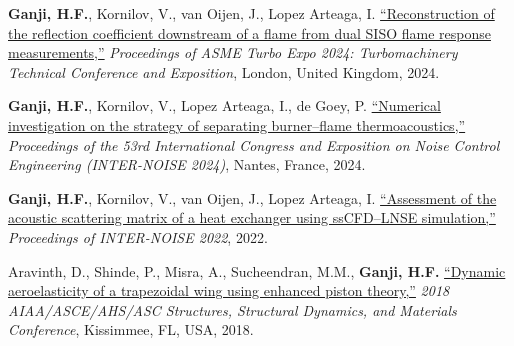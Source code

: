 \documentclass[a4paper,11pt]{article}
\begin{document}
\begin{enumerate}[
    leftmargin=*,
    labelsep=0.5em,
    align=left,
    widest={[\textbf{C.4}]},
    itemindent=0em
]

\item[\textbf{[C.1]}]
\textbf{Ganji, H.F.}, Kornilov, V., van Oijen, J., Lopez Arteaga, I.
\href{https://asmedigitalcollection.asme.org/GT/proceedings-abstract/GT2024/87943/V03AT04A015/1203898}
{``Reconstruction of the reflection coefficient downstream of a flame from dual SISO flame response measurements,''}
\textit{Proceedings of ASME Turbo Expo 2024: Turbomachinery Technical Conference and Exposition},
London, United Kingdom, 2024.

\item[\textbf{[C.2]}]
\textbf{Ganji, H.F.}, Kornilov, V., Lopez Arteaga, I., de Goey, P.
\href{https://www.ingentaconnect.com/content/ince/incecp/2024/00000270/00000002/art00012}
{``Numerical investigation on the strategy of separating burner--flame thermoacoustics,''}
\textit{Proceedings of the 53rd International Congress and Exposition on Noise Control Engineering (INTER-NOISE 2024)},
Nantes, France, 2024.

\item[\textbf{[C.3]}]
\textbf{Ganji, H.F.}, Kornilov, V., van Oijen, J., Lopez Arteaga, I.
\href{https://www.ioa.org.uk/catalogue/paper/assessment-acoustic-scattering-matrix-heat-exchanger-using-sscfd-lnse-simulation}
{``Assessment of the acoustic scattering matrix of a heat exchanger using ssCFD--LNSE simulation,''}
\textit{Proceedings of INTER-NOISE 2022}, 2022.

\item[\textbf{[C.4]}]
Aravinth, D., Shinde, P., Misra, A., Sucheendran, M.M., \textbf{Ganji, H.F.}
\href{https://arc.aiaa.org/doi/abs/10.2514/6.2018-1443}
{``Dynamic aeroelasticity of a trapezoidal wing using enhanced piston theory,''}
\textit{2018 AIAA/ASCE/AHS/ASC Structures, Structural Dynamics, and Materials Conference},
Kissimmee, FL, USA, 2018.

\end{enumerate}
\end{document}
